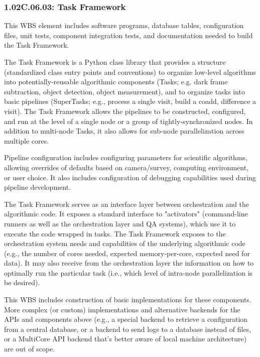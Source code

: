 \subsubsection{1.02C.06.03: Task Framework}

This WBS element includes software programs, database tables, configuration files, unit tests, component integration tests, and documentation needed to build the Task Framework.
 
The Task Framework is a Python class library that provides a structure (standardized class entry points and conventions) to organize low-level algorithms into potentially-reusable algorithmic components (Tasks; e.g. dark frame subtraction, object detection, object measurement), and to organize tasks into basic pipelines (SuperTasks; e.g., process a single visit, build a coadd, difference a visit). The Task Framework allows the pipelines to be constructed, configured, and run at the level of a single node or a group of tightly-synchronized nodes. In addition to multi-node Tasks, it also allows for sub-node parallelization across multiple cores.
 
Pipeline configuration includes configuring parameters for scientific algorithms, allowing overrides of defaults based on camera/survey, computing environment, or user choice.  It also includes configuration of debugging capabilities used during pipeline development.
 
The Task Framework serves as an interface layer between orchestration and the algorithmic code. It exposes a standard interface to "activators" (command-line runners as well as the orchestration layer and QA systems), which use it to execute the code wrapped in tasks. The Task Framework exposes to the orchestration system needs and capabilities of the underlying algorithmic code (e.g., the number of cores needed, expected memory-per-core, expected need for data). It may also receive from the orchestration layer the information on how to optimally run the particular task (i.e., which level of intra-node parallelization is be desired).
 
This WBS includes construction of basic implementations for these components.  More complex (or custom) implementations and alternative backends for the APIs and components above (e.g., a special backend to retrieve a configuration from a central database, or a backend to send logs to a database instead of files, or a MultiCore API backend that's better aware of local machine architecture) are out of scope.
